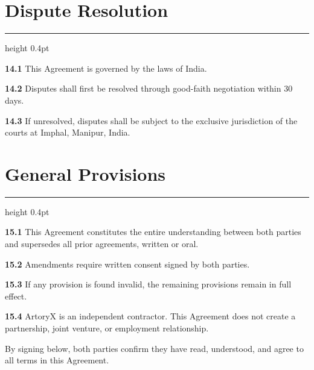\documentclass[a4paper, 11pt]{article}
\newcommand{\sectionrule}{%
  {\color{bordergray}\hrule height 0.4pt}%
  \vspace{5pt}%
}
\newcommand{\clausenum}[1]{%
  {\color{accent}\textbf{#1}}\;%
}
\begin{document}
\section{Dispute Resolution}
\sectionrule

{\small
\clausenum{14.1} This Agreement is governed by the laws of India.

\clausenum{14.2} Disputes shall first be resolved through good-faith negotiation within 30 days.

\clausenum{14.3} If unresolved, disputes shall be subject to the exclusive jurisdiction of the courts at Imphal, Manipur, India.
}


\section{General Provisions}
\sectionrule

{\small
\clausenum{15.1} This Agreement constitutes the entire understanding between both parties and supersedes all prior agreements, written or oral.

\clausenum{15.2} Amendments require written consent signed by both parties.

\clausenum{15.3} If any provision is found invalid, the remaining provisions remain in full effect.

\clausenum{15.4} ArtoryX is an independent contractor. This Agreement does not create a partnership, joint venture, or employment relationship.
}

\vspace{8mm}

\noindent
{}

\vspace{4mm}
\begin{center}
  {\large\bfseries\color{brand}\sffamilySIGNATURES}
\end{center}
\vspace{1mm}

{\small\color{muted}
By signing below, both parties confirm they have read, understood, and agree to all terms in this Agreement.
}

\vspace{6mm}
\end{document}
